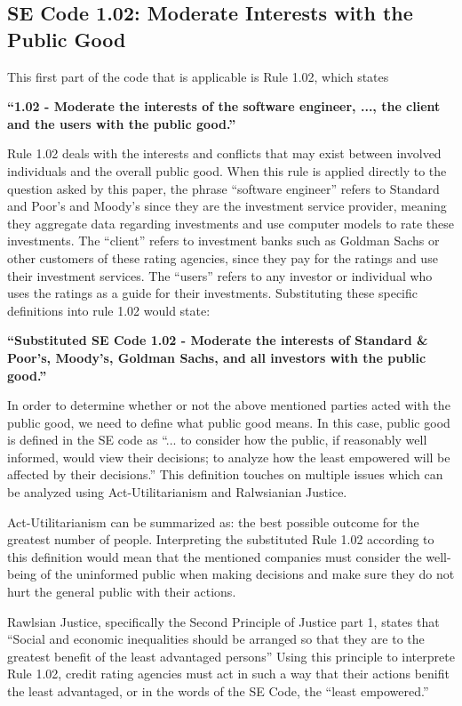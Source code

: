 \documentclass[11pt]{article}
\begin{document}
\begin{multicols}{2}
\subsection{SE Code 1.02: Moderate Interests with the Public Good}
This first part of the code that is applicable is Rule 1.02, which states
 

   \textbf{``1.02 - Moderate the interests of the software engineer, ..., the client and the users with the public good.''}


Rule 1.02 deals with the interests and conflicts that may exist between involved individuals and the overall public good.  When this rule is applied directly to the question asked by this paper, the phrase ``software engineer'' refers to Standard and Poor's and Moody's since they are the investment service provider, meaning they aggregate data regarding investments and use computer models to rate these investments. The ``client'' refers to investment banks such as Goldman Sachs or other customers of these rating agencies, since they pay for the ratings and use their investment services.  The ``users'' refers to any investor or individual who uses the ratings as a guide for their investments.  Substituting these specific definitions into rule 1.02 would state:


   \textbf{``Substituted SE Code 1.02 - Moderate the interests of Standard \& Poor's, Moody's, Goldman Sachs, and all investors with the public good.''}


In order to determine whether or not the above mentioned parties acted with the public good, we need to define what public good means.  In this case, public good is defined in the SE code as ``... to consider how the public, if reasonably well informed, would view their decisions; to analyze how the least empowered will be affected by their decisions.'' \cite{SECode}  This definition touches on multiple issues which can be analyzed using Act-Utilitarianism and Ralwsianian Justice. 

Act-Utilitarianism can be summarized as: the best possible outcome for the greatest number of people.\cite{utility}  Interpreting the substituted Rule 1.02 according to this definition would mean that the mentioned companies must consider the well-being of the uninformed public when making decisions and make sure they do not hurt the general public with their actions. 

Rawlsian Justice, specifically the Second Principle of Justice part 1, states that ``Social and economic inequalities should be arranged so that they are to the greatest benefit of the least advantaged persons'' \cite{rawlsian} Using this principle to interprete Rule 1.02, credit rating agencies must act in such a way that their actions benifit the least advantaged, or in the words of the SE Code, the ``least empowered.''  


\end{multicols}
\end{document}
